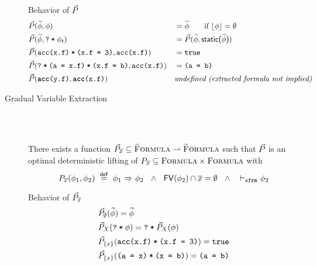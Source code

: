 \begin{description}
    \begin{example}{Behavior of $\vec{P}$}
        \begin{alignat*}{3}
        	 & \vec{P}(\widetilde{\phi}, \phi)            && = \widetilde{\phi}    \quad\quad \text{if } \lfloor\phi\rfloor = \emptyset & ~ \\
        	 & \vec{P}(\widetilde{\phi}, \textup{\texttt{\textup{\texttt{?}}\:*\:\ensuremath{\phi_t}}}) && = \vec{P}(\widetilde{\phi}, \textup{\textmd{\textsf{static($\widetilde{\phi}$)}}})                   & \\
             & \vec{P}(\textup{\texttt{acc(x.f)\:*\:(x.f = 3)}}, \textup{\texttt{acc(x.f)}}) && = \textup{\texttt{true}}                                         & \\
             & \vec{P}(\textup{\texttt{?\:*\:(a = x.f)\:*\:(x.f = b)}}, \textup{\texttt{acc(x.f)}}) && = \textup{\texttt{(a = b)}}                                        & \\
        	 & \vec{P}(\textup{\texttt{\textbf{acc}(y.f)}}, \textup{\texttt{\textbf{acc}(x.f)}}) && \textit{undefined (extracted formula not implied)}                 &
        \end{alignat*}
    \end{example}
    
    \item[Gradual Variable Extraction]~\\
    \begin{lemma}~\\
        There exists a function $\vec{P}_{\overline{x}} \subseteq \textup{\textsc{\ensuremath{\widetilde{\text{F}}}ormula}} \rightharpoonup \textup{\textsc{\ensuremath{\widetilde{\text{F}}}ormula}}$ such that
        $\vec{P}$ is an optimal deterministic lifting of $P_{\overline{x}} \subseteq \textup{\textsc{Formula}} \times \textup{\textsc{Formula}}$ with
        $$P_{\overline{x}}(\phi_1, \phi_2) ~\overset{\textup{\textmd{\textsf{def}}}}{=}~ {\phi_1} \,\,{\Rightarrow}\,\, {\phi_2} ~~\wedge~~ \textup{\textmd{\textsf{FV}}}(\phi_2) \cap \overline{x} = \emptyset ~~\wedge~~ \,\,{\vdash_\texttt{sfrm}}\,\, \phi_2$$
    \end{lemma}
    
    \begin{example}{Behavior of $\vec{P}_{\overline{x}}$}
        \begin{align*}
        &\vec{P}_{\emptyset}(\widetilde{\phi}) = \widetilde{\phi}\\
        &\vec{P}_{X}(\textup{\texttt{\textup{\texttt{?}}\:*\:\ensuremath{\phi}}}) = \textup{\texttt{\textup{\texttt{?}}\:*\:\ensuremath{\vec{P}_{X}(\phi)}}}\\
        &\vec{P}_{\{x\}}(\textup{\texttt{acc(x.f)\:*\:(x.f = 3)}}) = \textup{\texttt{true}}\\
        &\vec{P}_{\{x\}}(\textup{\texttt{(a = x)\:*\:(x = b)}}) = \textup{\texttt{(a = b)}}
        \end{align*}
    \end{example}
\end{description}